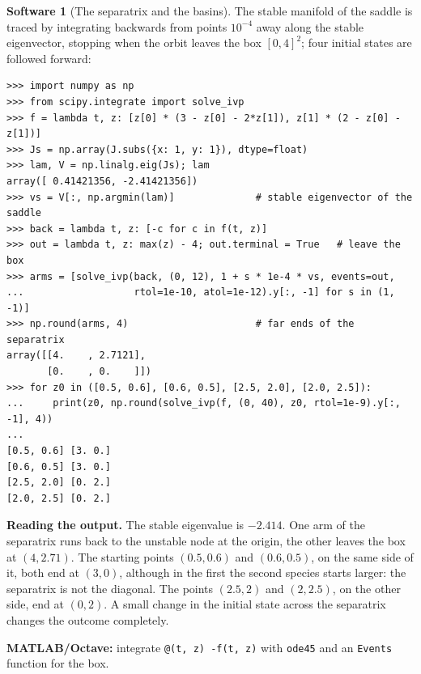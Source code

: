 \documentclass[11pt,a4paper]{article}
\numberwithin{equation}{section}
\theoremstyle{definition}
\newtheorem{software}[thm]{Software}
\begin{document}
\begin{software}[The separatrix and the basins]
\label{sw:separatrix}
The stable manifold of the saddle is traced by integrating backwards from points $10^{-4}$ away along the stable eigenvector, stopping when the orbit leaves the box $[0, 4]^2$; four initial states
are followed forward:
{\small\begin{verbatim}
>>> import numpy as np
>>> from scipy.integrate import solve_ivp
>>> f = lambda t, z: [z[0] * (3 - z[0] - 2*z[1]), z[1] * (2 - z[0] - z[1])]
>>> Js = np.array(J.subs({x: 1, y: 1}), dtype=float)
>>> lam, V = np.linalg.eig(Js); lam
array([ 0.41421356, -2.41421356])
>>> vs = V[:, np.argmin(lam)]              # stable eigenvector of the saddle
>>> back = lambda t, z: [-c for c in f(t, z)]
>>> out = lambda t, z: max(z) - 4; out.terminal = True   # leave the box
>>> arms = [solve_ivp(back, (0, 12), 1 + s * 1e-4 * vs, events=out,
...                   rtol=1e-10, atol=1e-12).y[:, -1] for s in (1, -1)]
>>> np.round(arms, 4)                      # far ends of the separatrix
array([[4.    , 2.7121],
       [0.    , 0.    ]])
>>> for z0 in ([0.5, 0.6], [0.6, 0.5], [2.5, 2.0], [2.0, 2.5]):
...     print(z0, np.round(solve_ivp(f, (0, 40), z0, rtol=1e-9).y[:, -1], 4))
...
[0.5, 0.6] [3. 0.]
[0.6, 0.5] [3. 0.]
[2.5, 2.0] [0. 2.]
[2.0, 2.5] [0. 2.]
\end{verbatim}}
\textbf{Reading the output.} The stable eigenvalue is $-2.414$. One arm of the separatrix runs back to the unstable node at the origin, the other leaves the box at $(4, 2.71)$. The starting points
$(0.5, 0.6)$ and $(0.6, 0.5)$, on the same side of it, both end at $(3, 0)$, although in the first the second species starts larger: the separatrix is not the diagonal. The points $(2.5, 2)$ and $(2, 2.5)$,
on the other side, end at $(0, 2)$. A small change in the initial state across the separatrix changes the outcome completely.

\textbf{MATLAB/Octave:} integrate \texttt{@(t, z) -f(t, z)} with \texttt{ode45} and an \texttt{Events} function for the box.
\end{software}
\end{document}
